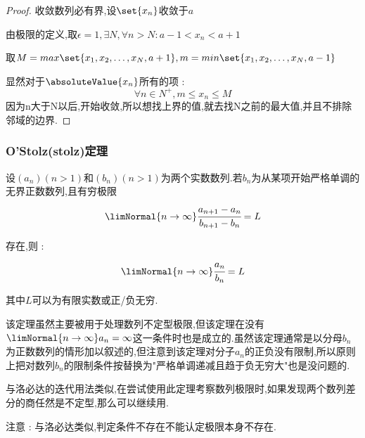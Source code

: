 {{{{\begin{enumerate}
{                  \begin{proof}
                      收敛数列必有界,设$\set{x_n}$收敛于$a$

                      由极限的定义,取$\epsilon = 1,\exists N,\forall n > N : a - 1 < x_n < a + 1$

                      取$M = max\set{x_1,x_2,\dots,x_N,a + 1},m = min\set{x_1,x_2,\dots,x_N,a - 1}$

                      显然对于$\absoluteValue{x_n}$所有的项 : $$
                          \forall n \in N^+,m \leq x_n \leq M
                      $$
                      因为n大于N以后,开始收敛,所以想找上界的值,就去找N之前的最大值,并且不排除邻域的边界.

                  \end{proof}
                  }
        \end{enumerate}
    }%

    \subsubsection{O'Stolz(stolz)定理}{
        设$(a_n)(n > 1)$和$(b_n)(n > 1)$为两个实数数列.若$b_n$为从某项开始严格单调的无界正数数列,且有穷极限
        $$
            \limNormal{n \to \infty}\cfrac{a_{n + 1} - a_n}{b_{n + 1} - b_n} = L
        $$

        存在,则 :
        $$
            \limNormal{n \to \infty}\cfrac{a_n}{b_n} = L
        $$

        其中$L$可以为有限实数或正/负无穷.

        该定理虽然主要被用于处理数列不定型极限,但该定理在没有$\limNormal{n \to \infty}a_n = \infty$这一条件时也是成立的.虽然该定理通常是以分母$b_n$为正数数列的情形加以叙述的,但注意到该定理对分子$a_n$的正负没有限制,所以原则上把对数列$b_n$的限制条件按替换为"严格单调递减且趋于负无穷大"也是没问题的.

        与洛必达的迭代用法类似,在尝试使用此定理考察数列极限时,如果发现两个数列差分的商任然是不定型,那么可以继续用.

        注意 : 与洛必达类似,判定条件不存在不能认定极限本身不存在.
    }%

}%

}%

}%